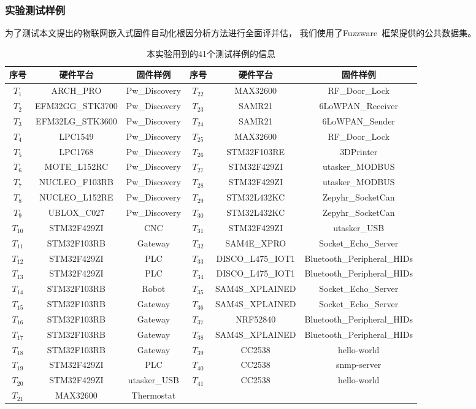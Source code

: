 \subsubsection{实验测试样例}
为了测试本文提出的物联网嵌入式固件自动化根因分析方法进行全面评并估，
我们使用了Fuzzware~\cite{Fuzzware}框架提供的公共数据集。
\begin{table}[h]\tiny
    \caption{本实验用到的41个测试样例的信息}
    \label{exp-0}
    \centering
    \begin{tabular}{@{}ccc|ccc@{}}\toprule
    序号 & 硬件平台 & 固件样例 & 序号 & 硬件平台 & 固件样例 \\ \midrule
    $T_1$ & ARCH\_PRO & Pw\_Discovery & $T_{22}$ & MAX32600 & RF\_Door\_Lock \\
    $T_2$ & EFM32GG\_STK3700 & Pw\_Discovery & $T_{23}$ & SAMR21 & 6LoWPAN\_Receiver \\
    $T_3$ & EFM32LG\_STK3600 & Pw\_Discovery & $T_{24}$ & SAMR21 & 6LoWPAN\_Sender \\
    $T_4$ & LPC1549 & Pw\_Discovery & $T_{25}$ & MAX32600 & RF\_Door\_Lock \\
    $T_5$ & LPC1768 & Pw\_Discovery & $T_{26}$ & STM32F103RE & 3DPrinter \\
    $T_6$ & MOTE\_L152RC & Pw\_Discovery & $T_{27}$ & STM32F429ZI & utasker\_MODBUS \\
    $T_7$ & NUCLEO\_F103RB & Pw\_Discovery & $T_{28}$ & STM32F429ZI & utasker\_MODBUS \\
    $T_8$ & NUCLEO\_L152RE & Pw\_Discovery & $T_{29}$ & STM32L432KC & Zepyhr\_SocketCan \\
    $T_9$ & UBLOX\_C027 & Pw\_Discovery & $T_{30}$ & STM32L432KC & Zepyhr\_SocketCan \\
    $T_{10}$ & STM32F429ZI & CNC & $T_{31}$ & STM32F429ZI & utasker\_USB \\
    $T_{11}$ & STM32F103RB & Gateway & $T_{32}$ & SAM4E\_XPRO & Socket\_Echo\_Server \\
    $T_{12}$ & STM32F429ZI & PLC & $T_{33}$ & DISCO\_L475\_IOT1 & Bluetooth\_Peripheral\_HIDs \\
    $T_{13}$ & STM32F429ZI & PLC & $T_{34}$ & DISCO\_L475\_IOT1 & Bluetooth\_Peripheral\_HIDs \\
    $T_{14}$ & STM32F103RB & Robot & $T_{35}$ & SAM4S\_XPLAINED & Socket\_Echo\_Server \\
    $T_{15}$ & STM32F103RB & Gateway & $T_{36}$ & SAM4S\_XPLAINED & Socket\_Echo\_Server \\
    $T_{16}$ & STM32F103RB & Gateway & $T_{37}$ & NRF52840 & Bluetooth\_Peripheral\_HIDs \\
    $T_{17}$ & STM32F103RB & Gateway & $T_{38}$ & SAM4S\_XPLAINED & Bluetooth\_Peripheral\_HIDs \\
    $T_{18}$ & STM32F103RB & Gateway & $T_{39}$ & CC2538 & hello-world \\
    $T_{19}$ & STM32F429ZI & PLC & $T_{40}$ & CC2538 & snmp-server \\
    $T_{20}$ & STM32F429ZI & utasker\_USB & $T_{41}$ & CC2538 & hello-world \\
    $T_{21}$ & MAX32600 & Thermostat &  &  &  \\
    \bottomrule
    \end{tabular}
\end{table}
